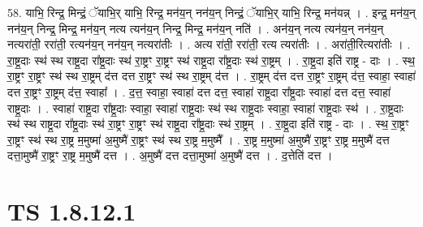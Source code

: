 \documentclass[17pt]{extarticle}
\begin{document}
58. याभि॒ रिन्द्र॒ मिन्द्रं॒ ॅयाभि॒र् याभि॒ रिन्द्र॒ मन॑य॒न् नन॑य॒न् निन्द्रं॒ ॅयाभि॒र् याभि॒ रिन्द्र॒ मन॑यन्न् । . इन्द्र॒ मन॑य॒न् नन॑य॒न् निन्द्र॒ मिन्द्र॒ मन॑य॒न् नत्य त्यन॑य॒न् निन्द्र॒ मिन्द्र॒ मन॑य॒न् नति॑ । . अन॑य॒न् नत्य त्यन॑य॒न् नन॑य॒न् नत्यरा॑ती॒ ररा॑ती॒ रत्यन॑य॒न् नन॑य॒न् नत्यरा॑तीः । . अत्य रा॑ती॒ ररा॑ती॒ रत्य त्यरा॑तीः । . अरा॑ती॒रित्यरा॑तीः । . रा॒ष्ट्र॒दाः स्थ॑ स्थ राष्ट्र॒दा रा᳚ष्ट्र॒दाः स्थ॑ रा॒ष्ट्रꣳ रा॒ष्ट्रꣳ स्थ॑ राष्ट्र॒दा रा᳚ष्ट्र॒दाः स्थ॑ रा॒ष्ट्रम् । . रा॒ष्ट्र॒दा इति॑ राष्ट्र - दाः । . स्थ॒ रा॒ष्ट्रꣳ रा॒ष्ट्रꣳ स्थ॑ स्थ रा॒ष्ट्रम् द॑त्त दत्त रा॒ष्ट्रꣳ स्थ॑ स्थ रा॒ष्ट्रम् द॑त्त । . रा॒ष्ट्रम् द॑त्त दत्त रा॒ष्ट्रꣳ रा॒ष्ट्रम् द॑त्त॒ स्वाहा॒ स्वाहा॑ दत्त रा॒ष्ट्रꣳ रा॒ष्ट्रम् द॑त्त॒ स्वाहा᳚ । . द॒त्त॒ स्वाहा॒ स्वाहा॑ दत्त दत्त॒ स्वाहा॑ राष्ट्र॒दा रा᳚ष्ट्र॒दाः स्वाहा॑ दत्त दत्त॒ स्वाहा॑ राष्ट्र॒दाः । . स्वाहा॑ राष्ट्र॒दा रा᳚ष्ट्र॒दाः स्वाहा॒ स्वाहा॑ राष्ट्र॒दाः स्थ॑ स्थ राष्ट्र॒दाः स्वाहा॒ स्वाहा॑ राष्ट्र॒दाः स्थ॑ । . रा॒ष्ट्र॒दाः स्थ॑ स्थ राष्ट्र॒दा रा᳚ष्ट्र॒दाः स्थ॑ रा॒ष्ट्रꣳ रा॒ष्ट्रꣳ स्थ॑ राष्ट्र॒दा रा᳚ष्ट्र॒दाः स्थ॑ रा॒ष्ट्रम् । . रा॒ष्ट्र॒दा इति॑ राष्ट्र - दाः । . स्थ॒ रा॒ष्ट्रꣳ रा॒ष्ट्रꣳ स्थ॑ स्थ रा॒ष्ट्र म॒मुष्मा॑ अ॒मुष्मै॑ रा॒ष्ट्रꣳ स्थ॑ स्थ रा॒ष्ट्र म॒मुष्मै᳚ । . रा॒ष्ट्र म॒मुष्मा॑ अ॒मुष्मै॑ रा॒ष्ट्रꣳ रा॒ष्ट्र म॒मुष्मै॑ दत्त दत्ता॒मुष्मै॑ रा॒ष्ट्रꣳ रा॒ष्ट्र म॒मुष्मै॑ दत्त । . अ॒मुष्मै॑ दत्त दत्ता॒मुष्मा॑ अ॒मुष्मै॑ दत्त । . द॒त्तेति॑ दत्त । \newline
\pagebreak
{}
\section*{ TS 1.8.12.1 }
\end{document}
